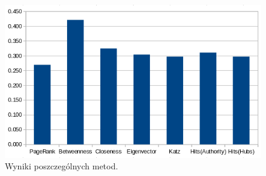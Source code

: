 \begin{figure}[H]
	\centering
		\includegraphics[width=0.75\linewidth]{img/results.png}
	\caption[Wyniki poszczególnych metod.]{Wyniki poszczególnych metod.}
	\label{fig:binary}
\end{figure}